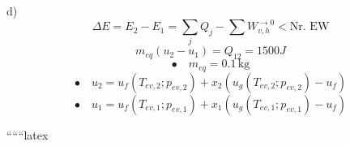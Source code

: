 d) 
\[
\Delta E = E_2 - E_1 = \sum_j Q_j - \sum W_{v,h}^{\rightarrow 0} < \text{Nr. EW}
\]
\[
m_{eq}(u_2 - u_1) = Q_{12} = 1500J
\]
\[
\bullet \quad m_{eq} = 0.1 \, \text{kg}
\]
\[
\bullet \quad u_2 = u_f \left( T_{ev,2} ; p_{ev,2} \right) + x_2 \left( u_g \left( T_{ev,2} ; p_{ev,2} \right) - u_f \right)
\]
\[
\bullet \quad u_1 = u_f \left( T_{ev,1} ; p_{ev,1} \right) + x_1 \left( u_g \left( T_{ev,1} ; p_{ev,1} \right) - u_f \right)
\]

``````latex